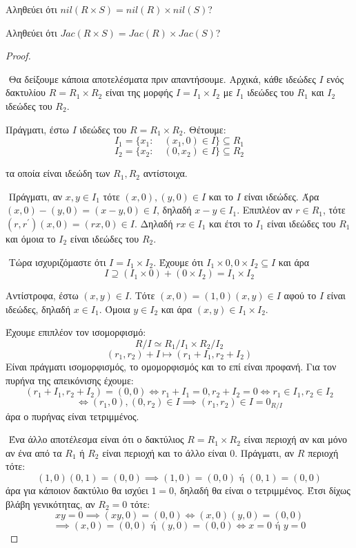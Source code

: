 \documentclass[oneside,a4paper]{article}
\begin{document}
\noindent Αληθεύει ότι $nil(R \times S) = nil(R) \times nil(S)$?

\noindent Αληθεύει ότι $Jac(R\times S) = Jac(R) \times Jac(S)$?

\begin{proof} $ $
	
	$ $\newline
	Θα δείξουμε κάποια αποτελέσματα πριν απαντήσουμε. Αρχικά, κάθε ιδεώδες $I$ ενός δακτυλίου $R = R_1 \times R_2$ είναι της μορφής $I = I_1 \times I_2$ με $I_1$ ιδεώδες του $R_1$ και $I_2$ ιδεώδες του $R_2$.

	Πράγματι, έστω $I$ ιδεώδες του $R = R_1 \times R_2$. Θέτουμε:
	$$I_1 = \{x_1 : \quad (x_1,0) \in I \} \subseteq R_1 $$
	$$I_2 = \{x_2 : \quad (0,x_2) \in I \} \subseteq R_2 $$

	τα οποία είναι ιδεώδη των $R_1, R_2$ αντίστοιχα. 
	
	$ $\newline
	Πράγματι, αν $x,y \in I_1$ τότε $(x,0),(y,0) \in I$ και το $I$ είναι ιδεώδες. Άρα $(x,0)-(y,0) = (x-y,0) \in I$, δηλαδή $x-y \in I_1$. Επιπλέον αν $r \in R_1$, τότε $(r,r^{\prime}) (x,0) = (rx,0) \in I$. Δηλαδή $rx \in I_1$ και έτσι το $I_1$ είναι ιδεώδες του $R_1$ και όμοια το $I_2$ είναι ιδεώδες του $R_2$.

	$ $\newline
	Τώρα ισχυριζόμαστε ότι $I = I_1 \times I_2$. Έχουμε ότι $I_1 \times 0, 0 \times I_2 \subseteq I$ και άρα 
	$$I \supseteq (I_1 \times 0) + (0 \times I_2) = I_1 \times I_2$$

	Αντίστροφα, έστω $(x,y) \in I$. Τότε $(x,0) = (1,0)(x,y) \in I$ αφού το $I$ είναι ιδεώδες, δηλαδή $x \in I_1$. Όμοια $y \in I_2$ και άρα $(x,y) \in I_1 \times I_2$.

	$ $\newline Έχουμε επιπλέον τον ισομορφισμό:
	$$R/I \simeq R_1 / I_1 \times R_2 / I_2$$
	$$(r_1,r_2) + I \longmapsto (r_1 + I_1, r_2 + I_2)$$
	Είναι πράγματι ισομορφισμός, το ομομορφισμός και το επί είναι προφανή. Για τον πυρήνα της απεικόνισης έχουμε:
	$$(r_1 + I_1, r_2 + I_2) = (0,0) \iff r_1 + I_1 = 0, r_2 + I_2 = 0 \iff r_1 \in I_1, r_2 \in I_2$$
	$$ \iff (r_1,0),(0,r_2) \in I \implies (r_1,r_2) \in I = 0_{R/I}$$
	άρα ο πυρήνας είναι τετριμμένος.

	$ $\newline
	Ένα άλλο αποτέλεσμα είναι ότι ο δακτύλιος $R = R_1 \times R_2$ είναι περιοχή αν και μόνο αν ένα από τα $R_1$ ή $R_2$ είναι περιοχή και το άλλο είναι $0$. Πράγματι, αν $R$ περιοχή τότε:
	$$(1,0)(0,1) = (0,0) \implies (1,0) = (0,0) \text{ ή } (0,1) = (0,0)$$
	άρα για κάποιον δακτύλιο θα ισχύει $1=0$, δηλαδή θα είναι ο τετριμμένος. Έτσι δίχως βλάβη γενικότητας, αν $R_2 = 0$ τότε:
	$$xy = 0 \implies (xy,0) = (0,0) \iff (x,0)(y,0) = (0,0)$$
	$$ \implies (x,0) = (0,0) \text{ ή } (y,0) = (0,0) \iff x = 0 \text{ ή } y =0$$
	

\end{proof}
\end{document}
